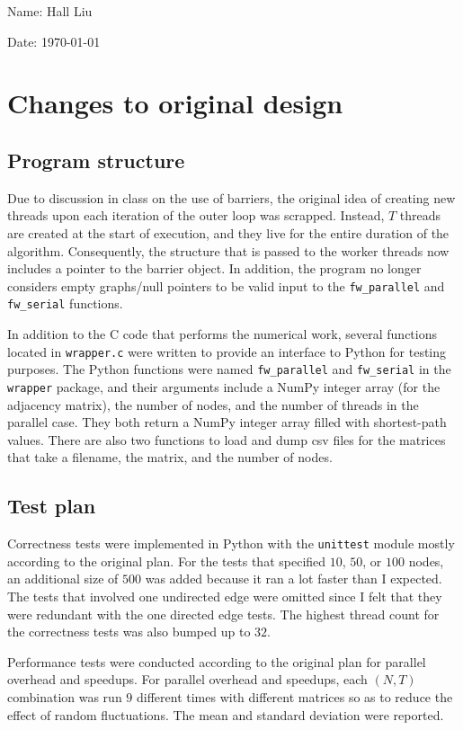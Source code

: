 \documentclass{article}
\begin{document}
Name: Hall Liu

Date: \today 
\vspace{20pt}

\section*{Changes to original design}
\subsection*{Program structure}
Due to discussion in class on the use of barriers, the original idea of creating new threads upon each iteration of the outer loop was scrapped. Instead, $T$ threads are created at the start of execution, and they live for the entire duration of the algorithm. Consequently, the structure that is passed to the worker threads now includes a pointer to the barrier object. In addition, the program no longer considers empty graphs/null pointers to be valid input to the \verb|fw_parallel| and \verb|fw_serial| functions.

In addition to the C code that performs the numerical work, several functions located in \verb|wrapper.c| were written to provide an interface to Python for testing purposes. The Python functions were named \verb|fw_parallel| and \verb|fw_serial| in the \verb|wrapper| package, and their arguments include a NumPy integer array (for the adjacency matrix), the number of nodes, and the number of threads in the parallel case. They both return a NumPy integer array filled with shortest-path values. There are also two functions to load and dump csv files for the matrices that take a filename, the matrix, and the number of nodes.
\subsection*{Test plan}
Correctness tests were implemented in Python with the \verb|unittest| module mostly according to the original plan. For the tests that specified $10$, $50$, or $100$ nodes, an additional size of $500$ was added because it ran a lot faster than I expected. The tests that involved one undirected edge were omitted since I felt that they were redundant with the one directed edge tests. The highest thread count for the correctness tests was also bumped up to $32$. 

Performance tests were conducted according to the original plan for parallel overhead and speedups. For parallel overhead and speedups, each $(N,T)$ combination was run $9$ different times with different matrices so as to reduce the effect of random fluctuations. The mean and standard deviation were reported. 
\end{document}

